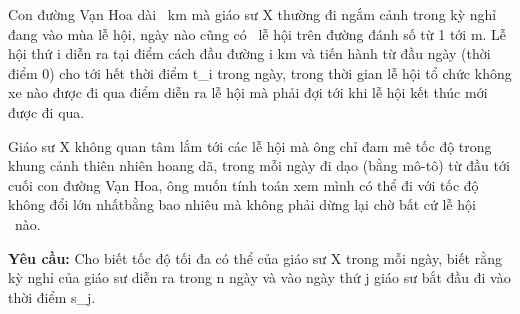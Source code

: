 Con đường Vạn Hoa dài                                                    km mà giáo sư X thường đi ngắm cảnh trong kỳ nghỉ đang vào mùa lễ hội, ngày nào cũng có     lễ hội trên đường đánh số từ 1 tới m. Lễ hội thứ i diễn ra tại điểm cách đầu đường i km và tiến hành từ đầu ngày (thời điểm 0) cho tới hết thời điểm t\_i trong ngày, trong thời gian lễ hội tổ chức không xe nào được đi qua điểm diễn ra lễ hội mà phải đợi tới khi lễ hội kết thúc mới được đi qua.  

   Giáo sư X không quan tâm lắm tới các lễ hội mà ông chỉ đam mê tốc độ trong khung cảnh thiên nhiên hoang dã, trong mỗi ngày đi dạo (bằng mô-tô) từ đầu tới cuối con đường Vạn Hoa, ông muốn tính toán xem mình có thể đi với tốc độ không đổi lớn nhấtbằng bao nhiêu mà không phải dừng lại chờ bất cứ lễ hội  nào.  

\textbf{    Yêu cầu:   }   Cho biết tốc độ tối đa có thể của giáo sư X trong mỗi ngày, biết rằng kỳ nghỉ của giáo sư diễn ra trong n ngày và vào ngày thứ j giáo sư bắt đầu đi vào thời điểm s\_j.  

\